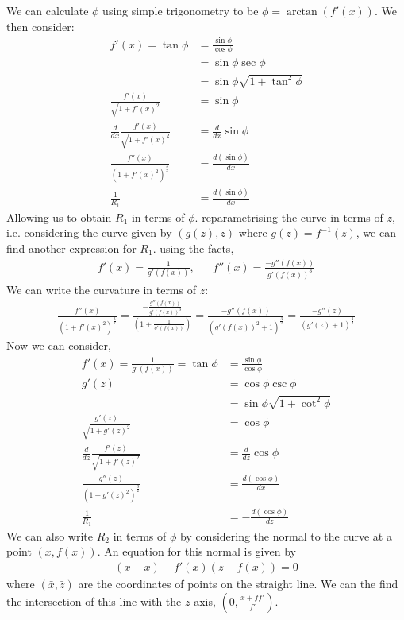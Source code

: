 We can calculate $\phi$ using simple trigonometry to be $\phi=\arctan(f'(x))$. We then consider:
\begin{align}
    f'(x)=\tan \phi &= \frac{\sin\phi}{\cos\phi} \\
    &=\sin\phi\sec\phi \\
    &=\sin\phi \sqrt{1+\tan^2\phi}\\
    \frac{f'(x)}{\sqrt{1+f'(x)^2}}&=\sin\phi\\
    \frac{d}{dx} \frac{f'(x)}{\sqrt{1+f'(x)^2}}&=\frac{d}{dx}\sin\phi \\
    \frac{f''(x)}{(1+f'(x)^2)^{\frac{3}{2}}}&=\frac{d(\sin\phi)}{dx} \\
    \frac{1}{R_1}&=\frac{d(\sin\phi)}{dx}
\end{align}
Allowing us to obtain $R_1$ in terms of $\phi$. reparametrising the curve in terms of $z$, i.e. considering the curve given by $(g(z),z)$ where $g(z)=f^{-1}(z)$, we can find another expression for $R_1$. using the facts,
\begin{align}
    f'(x)=\frac{1}{g'(f(x))}, && f''(x) = \frac{-g''(f(x))}{g'(f(x))^3}
\end{align}
We can write the curvature in terms of $z$:
\begin{align}
    \frac{f''(x)}{(1+f'(x)^2)^{\frac{3}{2}}}=\frac{-\frac{g''(f(x))}{g'(f(x))^3}}{(1+\frac{1}{g'(f(x))})} = \frac{-g''(f(x))}{(g'(f(x))^2+1)^{\frac{3}{2}}} = \frac{-g''(z)}{(g'(z)+1)^{\frac{3}{2}}}
\end{align}
Now we can consider,
\begin{align}
    f'(x)=\frac{1}{g'(f(x))}=\tan \phi &= \frac{\sin\phi}{\cos\phi} \\
    g'(z)&=\cos\phi\csc\phi \\
    &=\sin\phi \sqrt{1+\cot^2\phi}\\
    \frac{g'(z)}{\sqrt{1+g'(z)^2}}&=\cos\phi\\
    \frac{d}{dz} \frac{f'(z)}{\sqrt{1+f'(z)^2}}&=\frac{d}{dz}\cos\phi \\
    \frac{g''(z)}{(1+g'(z)^2)^{\frac{3}{2}}}&=\frac{d(\cos\phi)}{dx} \\
    \frac{1}{R_1}&=-\frac{d(\cos\phi)}{dz}
\end{align}
We can also write $R_2$ in terms of $\phi$ by considering the normal to the curve at a point $(x,f(x))$. An equation for this normal is given by
\begin{align}
    (\bar{x}-x) + f'(x)(\bar{z}-f(x))=0
\end{align}
where $(\bar{x},\bar{z})$ are the coordinates of points on the straight line. We can the find the intersection of this line with the $z$-axis, $(0,\frac{x+ff'}{f'})$.
